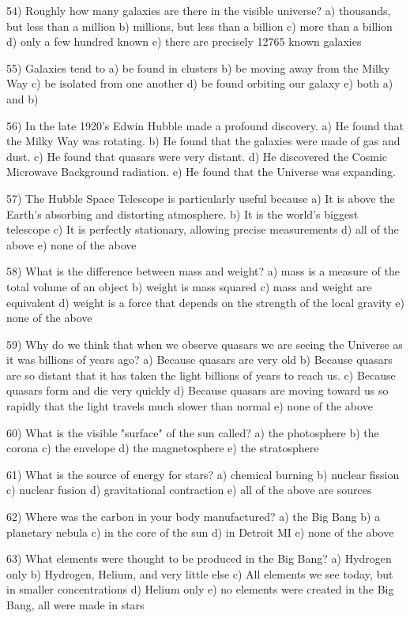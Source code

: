 54) Roughly how many galaxies are there in the visible universe?
a) thousands, but less than a million
b) millions, but less than a billion
c) more than a billion
d) only a few hundred known
e) there are precisely 12765 known galaxies

55) Galaxies tend to
a) be found in clusters
b) be moving away from the Milky Way
c) be isolated from one another
d) be found orbiting our galaxy
e) both a) and b)

56) In the late 1920's Edwin Hubble made a profound discovery.
a) He found that the Milky Way was rotating.
b) He found that the galaxies were made of gas and dust.
c) He found that quasars were very distant.
d) He discovered the Cosmic Microwave Background radiation.
e) He found that the Universe was expanding.

57) The Hubble Space Telescope is particularly useful because
a) It is above the Earth's absorbing and distorting atmosphere.
b) It is the world's biggest telescope
c) It is perfectly stationary, allowing precise measurements
d) all of the above
e) none of the above

58) What is the difference between mass and weight?
a) mass is a measure of the total volume of an object
b) weight is mass squared
c) mass and weight are equivalent
d) weight is a force that depends on the strength of the local gravity
e) none of the above

59) Why do we think that when we observe quasars we are seeing the Universe
as it was billions of years ago?
a) Because quasars are very old
b) Because quasars are so distant that it has taken the light billions
of years to reach us.
c) Because quasars form and die very quickly
d) Because quasars are moving toward us so rapidly that the light travels
much slower than normal
e) none of the above

60) What is the visible "surface" of the sun called?
a) the photosphere b) the corona c) the envelope d) the magnetosphere
e) the stratosphere

61) What is the source of energy for stars?
a) chemical burning b) nuclear fission c) nuclear fusion
d) gravitational contraction e) all of the above are sources

62) Where was the carbon in your body manufactured?
a) the Big Bang b) a planetary nebula c) in the core of the sun
d) in Detroit MI e) none of the above

63) What elements were thought to be produced in the Big Bang?
a) Hydrogen only
b) Hydrogen, Helium, and very little else
c) All elements we see today, but in smaller concentrations
d) Helium only
e) no elements were created in the Big Bang, all were made in stars

